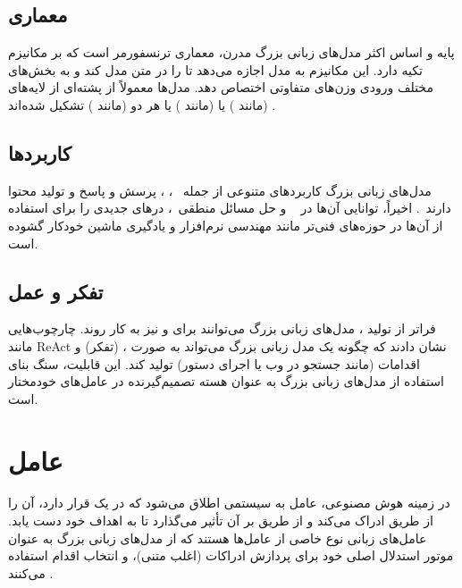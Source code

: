 \subsection{معماری}
پایه و اساس اکثر مدل‌های زبانی بزرگ مدرن، معماری ترنسفورمر است که بر مکانیزم  تکیه دارد. این مکانیزم به مدل اجازه می‌دهد تا  را در متن مدل کند و به بخش‌های مختلف ورودی وزن‌های متفاوتی اختصاص دهد. مدل‌ها معمولاً از پشته‌ای از لایه‌های  (مانند ) یا  (مانند ) یا هر دو (مانند ) تشکیل شده‌اند \cite{vaswani2017attention}.

\subsection{کاربردها}
مدل‌های زبانی بزرگ کاربردهای متنوعی از جمله ~\cite{wang-etal-2023-document-level}، ، پرسش و پاسخ و تولید محتوا دارند~\cite{minaee2024large}. اخیراً، توانایی آن‌ها در ~\cite{gao2023pal} و حل مسائل منطقی~\cite{pan-etal-2023-logic}، درهای جدیدی را برای استفاده از آن‌ها در حوزه‌های فنی‌تر مانند مهندسی نرم‌افزار و یادگیری ماشین خودکار گشوده است.

\subsection{تفکر و عمل}
فراتر از تولید ، مدل‌های زبانی بزرگ می‌توانند برای  و  نیز به کار روند. چارچوب‌هایی مانند ReAct \cite{yao2023react} نشان دادند که چگونه یک مدل زبانی بزرگ می‌تواند به صورت ،  (تفکر) و اقدامات (مانند جستجو در وب یا اجرای دستور) تولید کند. این قابلیت، سنگ بنای استفاده از مدل‌های زبانی بزرگ به عنوان هسته تصمیم‌گیرنده در عامل‌های خودمختار است.

\section{عامل}
در زمینه هوش مصنوعی، عامل به سیستمی اطلاق می‌شود که در یک  قرار دارد، آن را از طریق  ادراک می‌کند و از طریق  بر آن تأثیر می‌گذارد تا به اهداف خود دست یابد. عامل‌های زبانی نوع خاصی از عامل‌ها هستند که از مدل‌های زبانی بزرگ به عنوان موتور استدلال اصلی خود برای پردازش ادراکات (اغلب متنی)،  و انتخاب اقدام استفاده می‌کنند \cite{wang2024survey}.

